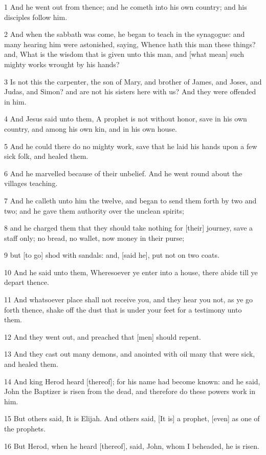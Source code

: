 \par 1 And he went out from thence; and he cometh into his own country; and his disciples follow him.
\par 2 And when the sabbath was come, he began to teach in the synagogue: and many hearing him were astonished, saying, Whence hath this man these things? and, What is the wisdom that is given unto this man, and [what mean] such mighty works wrought by his hands?
\par 3 Is not this the carpenter, the son of Mary, and brother of James, and Joses, and Judas, and Simon? and are not his sisters here with us? And they were offended in him.
\par 4 And Jesus said unto them, A prophet is not without honor, save in his own country, and among his own kin, and in his own house.
\par 5 And he could there do no mighty work, save that he laid his hands upon a few sick folk, and healed them.
\par 6 And he marvelled because of their unbelief. And he went round about the villages teaching.
\par 7 And he calleth unto him the twelve, and began to send them forth by two and two; and he gave them authority over the unclean spirits;
\par 8 and he charged them that they should take nothing for [their] journey, save a staff only; no bread, no wallet, now money in their purse;
\par 9 but [to go] shod with sandals: and, [said he], put not on two coats.
\par 10 And he said unto them, Wheresoever ye enter into a house, there abide till ye depart thence.
\par 11 And whatsoever place shall not receive you, and they hear you not, as ye go forth thence, shake off the dust that is under your feet for a testimony unto them.
\par 12 And they went out, and preached that [men] should repent.
\par 13 And they cast out many demons, and anointed with oil many that were sick, and healed them.
\par 14 And king Herod heard [thereof]; for his name had become known: and he said, John the Baptizer is risen from the dead, and therefore do these powers work in him.
\par 15 But others said, It is Elijah. And others said, [It is] a prophet, [even] as one of the prophets.
\par 16 But Herod, when he heard [thereof], said, John, whom I beheaded, he is risen.
